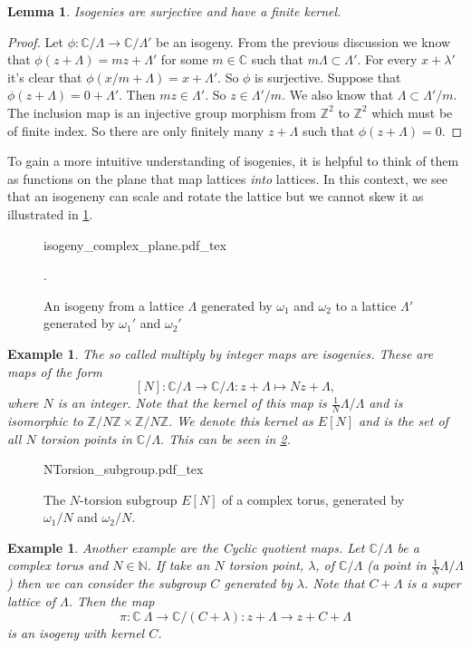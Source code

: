 \documentclass[a4paper]{article}
\newcommand{\incfig}[1]{%
	\def\svgwidth{\columnwidth}
	{#1.pdf_tex}
}
\theoremstyle{theoremdd}
\newtheorem{lemma}[theorem]{Lemma}
\theoremstyle{definitiondd}
\theoremstyle{remarkdd}
\newtheorem{example}[theorem]{Example}
\newcommand{\N}{\mathbb{N}}
\newcommand{\Z}{\mathbb{Z}}
\newcommand{\C}{\mathbb{C}}
\begin{document}
\begin{lemma}
	Isogenies are surjective and have a finite kernel. 
\end{lemma}
\begin{proof}
	Let $\phi: \C / \Lambda \to \C / \Lambda'$ be an isogeny. 
	From the previous discussion we know that $\phi(z+\Lambda) = mz + \Lambda'$ for some $m \in\C$ such that $m \Lambda \subset  \Lambda'$. 
	For every  $x + \lambda'$ it's clear that  $\phi( x / m + \Lambda) = x + \Lambda'$. 
	So  $\phi$ is surjective. 
	Suppose that $\phi(z + \Lambda) = 0 + \Lambda'$. Then  $m z \in \Lambda'$. So  $z \in  \Lambda'/m$. 
	We also know that  $\Lambda \subset \Lambda' / m$. 
	The inclusion map is an injective group morphism from $\Z^2$ to  $\Z^2$ which must be of finite index. 
	So there are only finitely many $z + \Lambda$ such that  $\phi(z + \Lambda) = 0$.
\end{proof}
To gain a more intuitive understanding of isogenies, it is helpful to think of them as functions on the plane that map lattices \emph{into} lattices.
In this context, we see that an isogeneny can scale and rotate the lattice but we cannot skew it as illustrated in \cref{fig:isogeny}.
\begin{figure}[h]
	\centering
\incfig{isogeny_complex_plane}
\caption{An isogeny from a lattice $\Lambda$ generated by $\omega_1$ and $\omega_2$ to a lattice $\Lambda'$ generated by $\omega_1'$ and $\omega_2'$}.
\label{fig:isogeny}
\end{figure}

\begin{example}
	The so called \emph{multiply by integer maps} are isogenies. These are maps of the form \[
		[N]: \C / \Lambda \to \C / \Lambda: z + \Lambda \mapsto  Nz + \Lambda
	,\] where $N$ is an integer. 
	Note that the kernel of this map is $\frac{1}{N}\Lambda / \Lambda$ and is isomorphic to $\Z / N \Z \times  \Z / N \Z$. We denote this kernel as $E[N]$ and is the set of all $N$ torsion points in $\C / \Lambda$. This can be seen in \cref{fig:Ntorsion_subgroup}.
\end{example}
	\begin{figure}[h]
		\incfig{NTorsion_subgroup}	
		\caption{The $N$-torsion subgroup $E[N]$ of a complex torus, generated by  $\omega_1 / N$ and $\omega_2 / N$.}
		\label{fig:Ntorsion_subgroup}
	\end{figure}
\begin{example}
	Another example are the \emph{Cyclic quotient maps}. 
	Let  $\C / \Lambda$ be a complex torus and  $N \in \N$.
	If take an $N$ torsion point, $\lambda$, of $\C / \Lambda$ (a point in $\frac{1}{N} \Lambda / \Lambda$) then we can consider the subgroup $C$ generated by $\lambda$. Note that $C + \Lambda$ is a super lattice of $\Lambda$. Then the map \[
		\pi: \C \ \Lambda \to \C / (C + \lambda): z + \Lambda \to z + C + \Lambda
	\]  
	is an isogeny with kernel $C$. 
\end{example}
\end{document}
